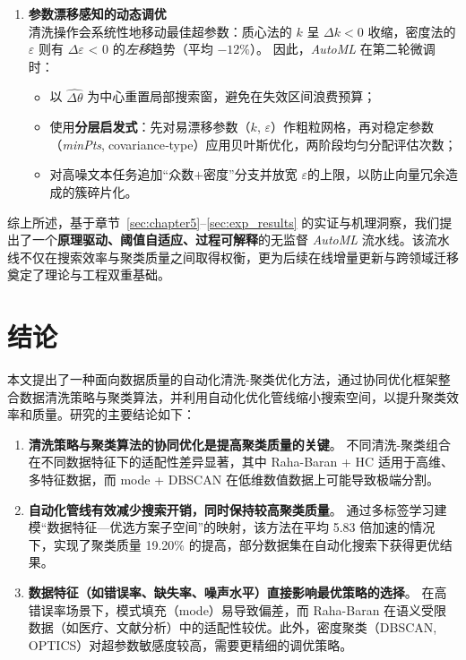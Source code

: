 \documentclass[10pt]{article} %
\numberwithin{equation}{section}
\begin{document}
\begin{enumerate}[leftmargin=1.6em,itemsep=4pt]
  \item \textbf{参数漂移感知的动态调优}  \\
        清洗操作会系统性地移动最佳超参数：质心法的 $k$ 呈 $\Delta k<0$ 收缩，密度法的 \(\varepsilon\) 则有 \(\Delta\varepsilon\) < 0 的\emph{左移}趋势（平均 $-12\%$）。  
        因此，\textit{AutoML} 在第二轮微调时：
        \begin{itemize}[leftmargin=1.6em,itemsep=4pt]
          \item 以 $\widehat{\Delta \theta}$ 为中心重置局部搜索窗，避免在失效区间浪费预算；
          \item 使用\textbf{分层启发式}：先对易漂移参数（$k$, \(\varepsilon\)）作粗粒网格，再对稳定参数（\textit{minPts},$\;$covariance‐type）应用贝叶斯优化，两阶段均匀分配评估次数；
          \item 对高噪文本任务追加“众数$+$密度”分支并放宽 \(\varepsilon\)的上限，以防止向量冗余造成的簇碎片化。
        \end{itemize}

\end{enumerate}

\vspace{0.5em}
\noindent
\textcolor[rgb]{0.00,0.07,1.00}{综上所述，基于章节~\ref{sec:chapter5}–\ref{sec:exp_results} 的实证与机理洞察，我们提出了一个\textbf{原理驱动、阈值自适应、过程可解释}的无监督 \textit{AutoML} 流水线。该流水线不仅在搜索效率与聚类质量之间取得权衡，更为后续在线增量更新与跨领域迁移奠定了理论与工程双重基础。}


\section{结论}
\label{sec:conclusion}

本文提出了一种面向数据质量的自动化清洗-聚类优化方法，通过协同优化框架整合数据清洗策略与聚类算法，并利用自动化优化管线缩小搜索空间，以提升聚类效率和质量。研究的主要结论如下：

\begin{enumerate}
    \item \textbf{清洗策略与聚类算法的协同优化是提高聚类质量的关键}。  
    不同清洗-聚类组合在不同数据特征下的适配性差异显著，其中 Raha-Baran + HC 适用于高维、多特征数据，而 mode + DBSCAN 在低维数值数据上可能导致极端分割。

    \item \textbf{自动化管线有效减少搜索开销，同时保持较高聚类质量}。  
    通过多标签学习建模“数据特征—优选方案子空间”的映射，该方法在平均 5.83 倍加速的情况下，实现了聚类质量 19.20\% 的提高，部分数据集在自动化搜索下获得更优结果。

    \item \textbf{数据特征（如错误率、缺失率、噪声水平）直接影响最优策略的选择}。  
    在高错误率场景下，模式填充（mode）易导致偏差，而 Raha-Baran 在语义受限数据（如医疗、文献分析）中的适配性较优。此外，密度聚类（DBSCAN, OPTICS）对超参数敏感度较高，需要更精细的调优策略。
\end{enumerate}
\end{document}
